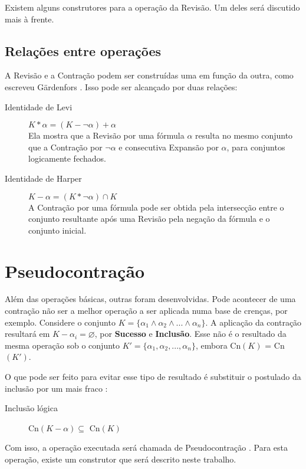 Existem alguns construtores para a operação da Revisão. Um deles será discutido mais à frente.

\subsection{Relações entre operações}

A Revisão e a Contração podem ser construídas uma em função da outra, como escreveu Gärdenfors \citep{revisaoGardenfors}. Isso pode ser alcançado por duas relações:

\begin{description}
	\item[Identidade de Levi] $ K \ast \alpha = (K - \lnot \alpha) + \alpha $ \\ Ela mostra que a Revisão por uma fórmula $ \alpha $ resulta no mesmo conjunto que a Con\-tra\-ção por $ \lnot \alpha $ e consecutiva Expansão por $ \alpha $, para conjuntos logicamente fechados.
	\item[Identidade de Harper] $ K - \alpha = (K \ast \lnot \alpha) \cap K $ \\ A Contração por uma fórmula pode ser obtida pela intersecção entre o conjunto resultante após uma Revisão pela negação da fórmula e o conjunto inicial.
\end{description}

\section{Pseudocontração}

Além das operações básicas, outras foram desenvolvidas. Pode acontecer de uma contração não ser a melhor operação a ser aplicada numa base de crenças, por exemplo. Considere o conjunto $ K = \{\alpha_1 \land \alpha_2 \land ... \land \alpha_n\} $. A aplicação da contração resultará em $ K - \alpha_i = \varnothing $, por \textbf{Sucesso} e \textbf{Inclusão}. Esse não é o resultado da mesma operação sob o conjunto $ K' = \{\alpha_1, \alpha_2, ..., \alpha_n\} $, embora Cn$(K)$ = Cn$(K')$.

O que pode ser feito para evitar esse tipo de resultado é substituir o postulado da inclusão por um mais fraco \citep{revisaoHansson3}:

\begin{description}
	\item[Inclusão lógica] Cn$(K - \alpha) \subseteq $ Cn$(K)$ 
\end{description}

Com isso, a operação executada será chamada de Pseudocontração \citep{revisaoHansson4}. Para esta operação, existe um construtor que será descrito neste trabalho.

